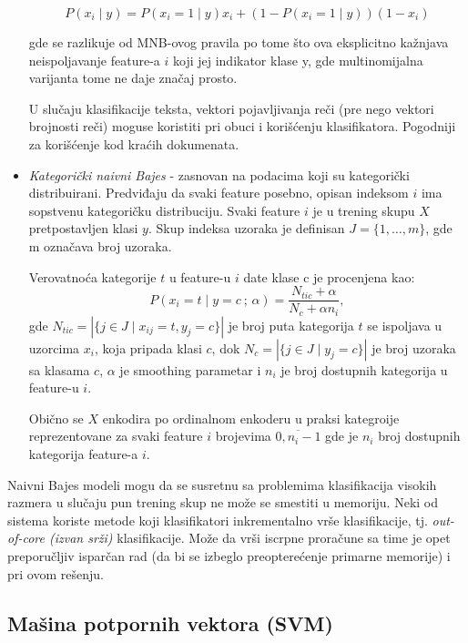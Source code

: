 \documentclass[fontsize=12bp, paper=a4]{scrarticle}
\begin{document}
\begin{itemize}
    $$P(x_i \mid y) = P(x_i = 1 \mid y) x_i + (1 - P(x_i = 1 \mid y)) (1 - x_i)$$
    
    gde se razlikuje od MNB-ovog pravila po tome što ova eksplicitno kažnjava neispoljavanje feature-a $i$ koji jej indikator klase y, gde multinomijalna varijanta tome ne daje značaj prosto.

    U slučaju klasifikacije teksta, vektori pojavljivanja reči (pre nego vektori brojnosti reči) moguse koristiti pri obuci i korišćenju klasifikatora. Pogodniji za korišćenje kod kraćih dokumenata.

    \item \textit{Kategorički naivni Bajes} - zasnovan na podacima koji su kategorički distribuirani. Predviđaju da svaki feature posebno, opisan indeksom $i$ ima sopstvenu kategoričku distribuciju.
    Svaki feature $i$ je u trening skupu $X$ pretpostavljen klasi $y$. Skup indeksa uzoraka je definisan $J = \{1,\dots,m\}$, gde m označava broj uzoraka.

    Verovatnoća kategorije $t$ u feature-u $i$ date klase c je procenjena kao:
    $$P(x_i = t \mid y = c \: ;\, \alpha) = \frac{ N_{tic} + \alpha}{N_{c} +
                                       \alpha n_i},$$
    gde $N_{tic} = |\{j \in J \mid x_{ij} = t, y_j = c\}|$ je broj puta kategorija $t$ se ispoljava u uzorcima $x_i$, koja pripada klasi $c$, dok $N_{c} = |\{ j \in J\mid y_j = c\}|$ je broj uzoraka sa klasama $c$, $\alpha$ je smoothing parametar i $n_i$ je broj dostupnih kategorija u feature-u $i$.

    Obično se $X$ enkodira po ordinalnom enkoderu\cite{ordinal} u praksi kategroije reprezentovane za svaki feature $i$ brojevima $\overline{0,n_i-1}$ gde je $n_i$ broj dostupnih kategorija feature-a $i$.
\end{itemize}

Naivni Bajes modeli mogu da se susretnu sa problemima klasifikacija visokih razmera u slučaju pun trening skup ne može se smestiti u memoriju. Neki od sistema koriste metode koji klasifikatori inkrementalno vrše klasifikacije, tj. \textit{out-of-core (izvan srži)} klasifikacije. Može da vrši iscrpne proračune sa time je opet preporučljiv isparčan rad (da bi se izbeglo preopterećenje primarne memorije) i pri ovom rešenju.
\newpage

\subsection{Mašina potpornih vektora (SVM)\cite{svm}}
\end{document}

